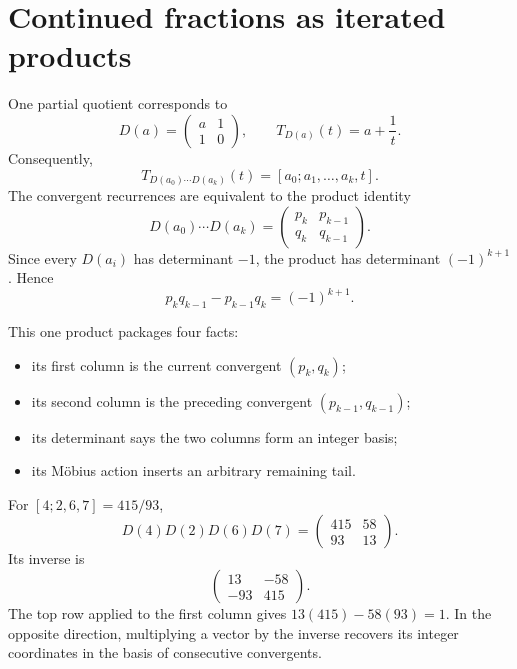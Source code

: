 \section{Continued fractions as iterated products}

One partial quotient corresponds to
\[
  D(a)=\begin{pmatrix}a&1\\1&0\end{pmatrix},
  \qquad T_{D(a)}(t)=a+\frac1t.
\]
Consequently,
\[
 T_{D(a_0)\cdots D(a_k)}(t)
 =[a_0;a_1,\dots,a_k,t].
\]
The convergent recurrences are equivalent to the product identity
\[
 D(a_0)\cdots D(a_k)
 =\begin{pmatrix}p_k&p_{k-1}\\q_k&q_{k-1}\end{pmatrix}.
\]
Since every $D(a_i)$ has determinant $-1$, the product has determinant
$(-1)^{k+1}$. Hence
\[
 p_kq_{k-1}-p_{k-1}q_k=(-1)^{k+1}.
\]

This one product packages four facts:
\begin{itemize}
  \item its first column is the current convergent $(p_k,q_k)$;
  \item its second column is the preceding convergent $(p_{k-1},q_{k-1})$;
  \item its determinant says the two columns form an integer basis;
  \item its M\"obius action inserts an arbitrary remaining tail.
\end{itemize}

\begin{example}
For $[4;2,6,7]=415/93$,
\[
 D(4)D(2)D(6)D(7)
 =\begin{pmatrix}415&58\\93&13\end{pmatrix}.
\]
Its inverse is
\[
 \begin{pmatrix}13&-58\\-93&415\end{pmatrix}.
\]
The top row applied to the first column gives
$13(415)-58(93)=1$. In the opposite direction, multiplying a vector by the
inverse recovers its integer coordinates in the basis of consecutive
convergents.
\end{example}

